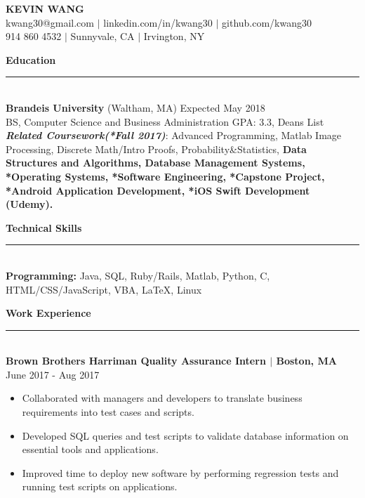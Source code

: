 \documentclass{article}
\newcommand{\HRule}{\rule{\linewidth}{0.4mm}}
\begin{document}



\begin{center}
\textbf{{\LARGE {\Huge {KEVIN WANG}}}} \\ 
{\fontsize{11}{13.2} kwang30@gmail.com  $|$ linkedin.com/in/kwang30 $|$ github.com/kwang30 \\
914 860 4532 $|$ Sunnyvale, CA $|$ Irvington, NY}\\[1ex]
\end{center}
\vspace{-2mm}
\normalsize

\noindent
\textbf{{\Large Education}}\\[-2mm]
\HRule\\
\textbf{Brandeis University} (Waltham, MA)
\hfill Expected May 2018 \\
\indent
BS, Computer Science and Business Administration
\hfill{GPA: 3.3, Deans List}\\
\textit{\textbf{Related Coursework(*Fall 2017)}}: Advanced Programming, Matlab Image Processing, Discrete Math/Intro Proofs, Probability\&Statistics, {\textbf{Data Structures and Algorithms, Database Management Systems, *Operating Systems, *Software Engineering, *Capstone Project, *Android Application Development, *iOS Swift Development (Udemy).}}
\vspace{2mm}


\noindent
\textbf{{\Large Technical Skills}}\\[-2mm]
\HRule\\
\textbf{Programming:} Java, SQL, Ruby/Rails, Matlab, Python, C, HTML/CSS/JavaScript, VBA, \LaTeX, Linux \vspace{2mm}

\noindent
\textbf{{\Large Work Experience}}\\[-2mm]
\HRule\\
\noindent
\textbf{Brown Brothers Harriman Quality Assurance Intern $|$ Boston, MA}
\hfill June 2017 - Aug 2017

\begin{itemize}[leftmargin=*]
\vspace{-2.5mm}
\item Collaborated with managers and developers to translate business requirements into test cases and scripts.
\vspace{-2.5mm}
\item Developed SQL queries and test scripts to validate database information on essential tools and applications.
\vspace{-2.5mm}
\item Improved time to deploy new software by performing regression tests and running test scripts on applications.
\end{itemize}
\vspace{-2.0mm}
\end{document}
